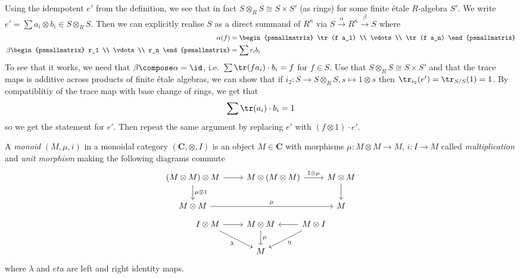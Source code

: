 \documentclass[a4paper]{article}
\renewcommand{\c}[1]{\mathbf{#1}}
\begin{document}
Using the idempotent \(e'\) from the definition, we see that in fact \(S \otimes_R S \cong S \times S'\) (as rings) for some finite étale \(R\)-algebra \(S'\). We write \(e' = \sum a_i \otimes b_i \in S \otimes_R S\). Then we can explicitly realise \(S\) as a direct summand of \(R^n\) via \(S \xrightarrow{\alpha} R^n \xrightarrow{\beta} S\) where
\begin{align*}
  \alpha(f) &=
              \begin{psmallmatrix}
                \tr (f a_1) \\
                \vdots \\
                \tr (f a_n)
              \end{psmallmatrix}
  \\
  \beta
  \begin{psmallmatrix}
    r_1 \\
    \vdots \\
    r_n
  \end{psmallmatrix}
            &= \sum r_i b_i
\end{align*}
To see that it works, we need that \(\beta \compose \alpha = \id\), i.e.\ \(\sum \tr(f a_i) \cdot b_i = f\) for \(f \in S\). Use that \(S \otimes_R S \cong S \times S'\) and that the trace maps is additive across products of finite étale algebras, we can show that if \(i_2: S \to S \otimes_R S, s \mapsto 1 \otimes s\) then \(\tr_{i_2} (e') = \tr_{S/S}(1) = 1\). By compatiblitiy of the trace map with base change of rings, we get that
\[
  \sum \tr(a_i) \cdot b_i = 1
\]
so we get the statement for \(e'\). Then repeat the same argument by replacing \(e'\) with \((f \otimes 1) \cdot e'\).

\begin{definition}
  A \emph{monoid} \((M, \mu, i)\) in a monoidal category \((\c C, \otimes, I)\) is an object \(M \in \c C\) with morphisms \(\mu: M \otimes M \to M\), \(i: I \to M\) called \emph{multiplication} and \emph{unit morphism} making the following diagrams commute
  \[
    \begin{tikzcd}
      (M \otimes M) \otimes M \ar[r] \ar[d, "\mu \otimes 1"] & M \otimes (M \otimes M) \ar[r, "1 \otimes \mu"] & M \otimes M \ar[d] \\
      M \otimes M \ar[rr, "\mu"] && M
    \end{tikzcd}
  \]
  \[
    \begin{tikzcd}
      I \otimes M \ar[r] \ar[dr, "\lambda"'] & M \otimes M \ar[d, "\mu"] & M \otimes I \ar[l] \ar[dl, "\eta"] \\
      & M
    \end{tikzcd}
  \]
  where \(\lambda\) and \(eta\) are left and right identity maps.
\end{definition}
\end{document}
